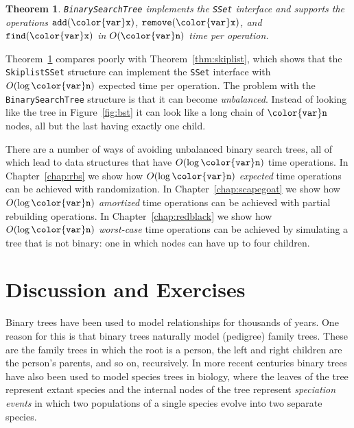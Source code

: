 \documentclass[10pt]{book}
\newcommand{\chapref}[1]{Chapter~\ref{chap:#1}}
\newcommand{\figref}[1]{Figure~\ref{fig:#1}}
\theoremstyle{plain}
\newtheorem{thm}{Theorem}[chapter]
\newcommand{\thmlabel}[1]{\label{thm:#1}}
\newcommand{\thmref}[1]{Theorem~\ref{thm:#1}}
\theoremstyle{definition}
\begin{document}
\begin{thm}\thmlabel{bst}
  \texttt{BinarySearchTree} implements the \texttt{SSet} interface and 
  supports the operations \ensuremath{\mathtt{add({\color{var}x})}}, \ensuremath{\mathtt{remove({\color{var}x})}},
  and \ensuremath{\mathtt{find({\color{var}x})}} in $O(\ensuremath{\mathtt{{\color{var}n}}})$ time per operation.
\end{thm}

\thmref{bst} compares poorly with \thmref{skiplist}, which shows
that the \texttt{SkiplistSSet} structure can implement the \texttt{SSet} interface
with $O(\log \ensuremath{\mathtt{{\color{var}n}}})$ expected time per operation.  The problem with the
\texttt{BinarySearchTree} structure is that it can become \emph{unbalanced}.
Instead of looking like the tree in \figref{bst} it can look like a long
chain of \ensuremath{\mathtt{{\color{var}n}}} nodes, all but the last having exactly one child.

There are a number of ways of avoiding unbalanced binary search
trees, all of which lead to data structures that have $O(\log
\ensuremath{\mathtt{{\color{var}n}}})$ time operations. In \chapref{rbs} we show how $O(\log \ensuremath{\mathtt{{\color{var}n}}})$
\emph{expected} time operations can be achieved with randomization.
In \chapref{scapegoat} we show how $O(\log \ensuremath{\mathtt{{\color{var}n}}})$ \emph{amortized}
time operations can be achieved with partial rebuilding operations.
In \chapref{redblack} we show how $O(\log \ensuremath{\mathtt{{\color{var}n}}})$ \emph{worst-case}
time operations can be achieved by simulating a tree that is not binary:
one in which nodes can have up to four children.

\section{Discussion and Exercises}

Binary trees have been used to model relationships for thousands
of years.  One reason for this is that binary trees naturally model
(pedigree) family trees.
%
%
These are the family trees in which the root is
a person, the left and right children are the person's parents, and so
on, recursively.  In more recent centuries binary trees have also been
used to model species trees
 in biology, where the leaves of the tree
represent extant species and the internal nodes of the tree represent
\emph{speciation events}
 in which two populations of a single species
evolve into two separate species.
\end{document}
